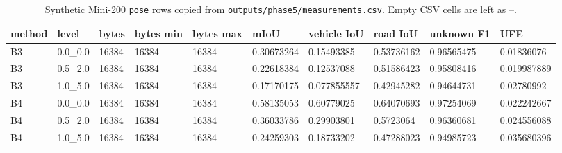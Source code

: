 \begin{table}[t]
\centering
\caption{Synthetic Mini-200 \texttt{pose} rows copied from \texttt{outputs/phase5/measurements.csv}. Empty CSV cells are left as --.}
\label{tab:pose}
\scriptsize
\setlength{\tabcolsep}{3pt}
\begin{tabular}{llllllllll}
\toprule
method & level & bytes & bytes min & bytes max & mIoU & vehicle IoU & road IoU & unknown F1 & UFE \\
\midrule
B3 & 0.0\_0.0 & 16384 & 16384 & 16384 & 0.30673264 & 0.15493385 & 0.53736162 & 0.96565475 & 0.01836076 \\
B3 & 0.5\_2.0 & 16384 & 16384 & 16384 & 0.22618384 & 0.12537088 & 0.51586423 & 0.95808416 & 0.019987889 \\
B3 & 1.0\_5.0 & 16384 & 16384 & 16384 & 0.17170175 & 0.077855557 & 0.42945282 & 0.94644731 & 0.02780992 \\
B4 & 0.0\_0.0 & 16384 & 16384 & 16384 & 0.58135053 & 0.60779025 & 0.64070693 & 0.97254069 & 0.022242667 \\
B4 & 0.5\_2.0 & 16384 & 16384 & 16384 & 0.36033786 & 0.29903801 & 0.5723064 & 0.96360681 & 0.024556088 \\
B4 & 1.0\_5.0 & 16384 & 16384 & 16384 & 0.24259303 & 0.18733202 & 0.47288023 & 0.94985723 & 0.035680396 \\
\bottomrule
\end{tabular}
\end{table}
